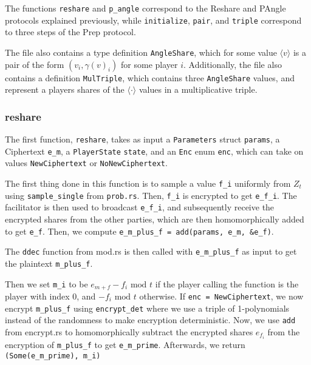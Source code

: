 \documentclass[../main.tex]{subfiles}
\begin{document}
The functions \lstinline{reshare} and \lstinline{p_angle} correspond to the Reshare and PAngle protocols explained previously, while \lstinline{initialize}, \lstinline{pair}, and \lstinline{triple} correspond to three steps of the Prep protocol.

The file also contains a type definition \lstinline{AngleShare}, which for some value $\langle v \rangle$ is a pair of the form $(v_i, \gamma(v)_i)$ for some player $i$. Additionally, the file also contains a definition \lstinline{MulTriple}, which contains three \lstinline{AngleShare} values, and represent a players shares of the $\langle \cdot \rangle$ values in a multiplicative triple. %

\subsubsection{reshare}
The first function, \lstinline{reshare}, takes as input a \lstinline{Parameters} struct \lstinline{params}, a Ciphertext \lstinline{e_m}, a  \lstinline{PlayerState} \lstinline{state}, and an \lstinline{Enc} enum \lstinline{enc}, which can take on values \lstinline{NewCiphertext} or \lstinline{NoNewCiphertext}.

The first thing done in this function is to sample a value \lstinline{f_i} uniformly from $Z_t$ using \lstinline{sample_single} from \lstinline{prob.rs}. Then, \lstinline{f_i} is encrypted to get \lstinline{e_f_i}.
The facilitator is then used to broadcast \lstinline{e_f_i}, and subsequently receive the encrypted shares from the other parties, which are then homomorphically added to get \lstinline{e_f}. Then, we compute \lstinline{e_m_plus_f = add(params, e_m, &e_f)}.

The \lstinline{ddec} function from mod.rs is then called with \lstinline{e_m_plus_f} as input to get the plaintext \lstinline{m_plus_f}.

Then we set \lstinline{m_i} to be $e_{m + f} - f_i \text{ mod } t$ if the player calling the function is the player with index $0$, and $- f_i \text{ mod } t$ otherwise. If \lstinline{enc = NewCiphertext}, we now encrypt \lstinline{m_plus_f} using \lstinline{encrypt_det} where we use a triple of 1-polynomials instead of the randomness to make encryption deterministic. Now, we use \lstinline{add} from encrypt.rs to homomorphically subtract the encrypted shares $e_{f_i}$ from the encryption of \lstinline{m_plus_f} to get \lstinline{e_m_prime}. Afterwards, we return \lstinline{(Some(e_m_prime), m_i)}
\end{document}
